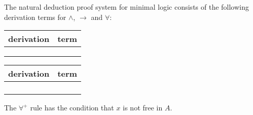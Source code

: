\begin{mydef} 
The natural deduction proof system for minimal logic  consists of the following derivation terms for $\wedge$, $\to$ and $\forall$: 
\begin{center}

\begin{tabular}{| c | c |} \hline
derivation & term \\
\hline 
\raisebox{-1\height}{$u:A$} & \raisebox{-1\height}{$u^A$} \\ [3ex] \hline
\raisebox{-1.2\height}{
\AxiomC{$|M$}
\noLine
\UnaryInfC{$A$}
\AxiomC{$|N$}
\noLine
\UnaryInfC{$B $}
\RightLabel{$\wedge^+$}
\BinaryInfC{$A \wedge B$}
\DisplayProof} &  \raisebox{-2.8\height}{$\langle M^A, N^B \rangle^{A \wedge B}$} \\ [10ex]  \hline
\raisebox{-1.5\height}{
\AxiomC{$|M$}
\noLine
\UnaryInfC{$A \wedge B$}
\RightLabel{$\wedge^-_0$}
\UnaryInfC{$A$}
\DisplayProof \hspace{10pt}
\AxiomC{$|M$}
\noLine
\UnaryInfC{$A \wedge B$}
\RightLabel{$\wedge^-_1$}
\UnaryInfC{$B$}
\DisplayProof} & \raisebox{-2.8\height}{$(M^{A \wedge B} 0)^A \quad (M^{A \wedge B} 1)^B$} \\ [10ex] \hline

\end{tabular}
\end{center}

\begin{center}
\begin{tabular}{|c|c|} \hline

derivation & term \\ \hline

\raisebox{-1\height}{
\AxiomC{$\mathass{u: \,A}$}
\noLine
\UnaryInfC{$| \,M$}
\noLine
\UnaryInfC{$B$}
\RightLabel{$\to^+$}
\UnaryInfC{$A \to B$}
\DisplayProof} & \raisebox{-3.2\height}{$(\lambda u^AM^B)^{A \to B}$} \\ [12ex] \hline

\raisebox{-1\height}{
\AxiomC{$|M$}
\noLine
\UnaryInfC{$A \to B$}
\AxiomC{$|N$}
\noLine
\UnaryInfC{$A$}
\RightLabel{$\to^-$}
\BinaryInfC{$B$}
\DisplayProof} & \raisebox{-1.2\height}{$(M^{A \to B} N^{A})^B$} \\ [5ex] \hline



\raisebox{-1\height}{
\AxiomC{$|M$}
\noLine
\UnaryInfC{$A$}
\RightLabel{$\forall^+x \ (var.cond.)$}
\UnaryInfC{$\forall x A$}
\DisplayProof} & \raisebox{-2.8\height}{$(\lambda x M^A)^{\forall x A} \, (var.cond.)$}  \\ [10ex] \hline

\raisebox{-1\height}{
\AxiomC{$|M$}
\noLine
\UnaryInfC{$\forall x. A$}
\AxiomC{t}
\RightLabel{$\forall^-$}
\BinaryInfC{$A[x:=t]$}
\DisplayProof} & \raisebox{-2.8\height}{$(M^{\forall x A}t)^{A[x:=t]}$} \\ [10ex] \hline


\end{tabular}
\end{center}

The $\forall^{+}$ rule has the condition that $x$ is not free in $A$. 

\end{mydef}
